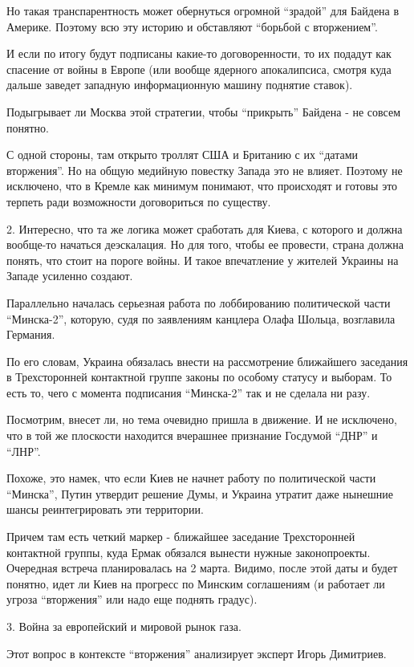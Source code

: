 Но такая транспарентность может обернуться огромной \enquote{зрадой} для Байдена в
Америке. Поэтому всю эту историю и обставляют \enquote{борьбой с вторжением}.

И если по итогу будут подписаны какие-то договоренности, то их подадут как
спасение от войны в Европе (или вообще ядерного апокалипсиса, смотря куда
дальше заведет западную информационную машину поднятие ставок). 

Подыгрывает ли Москва этой стратегии, чтобы \enquote{прикрыть} Байдена - не совсем
понятно.

С одной стороны, там открыто троллят США и Британию с их \enquote{датами вторжения}. Но
на общую медийную повестку Запада это не влияет. Поэтому не исключено, что в
Кремле как минимум понимают, что происходят и готовы это терпеть ради
возможности договориться по существу. 

2. Интересно, что та же логика может сработать для Киева, с которого и должна
вообще-то начаться деэскалация. Но для того, чтобы ее провести, страна должна
понять, что стоит на пороге войны. И такое впечатление у жителей Украины на
Западе усиленно создают. 

Параллельно началась серьезная работа по лоббированию политической части
\enquote{Минска-2}, которую, судя по заявлениям канцлера Олафа Шольца, возглавила
Германия.

По его словам, Украина обязалась внести на рассмотрение ближайшего заседания в
Трехсторонней контактной группе законы по особому статусу и выборам. То есть
то, чего с момента подписания \enquote{Минска-2} так и не сделала ни разу. 

Посмотрим, внесет ли, но тема очевидно пришла в движение. И не исключено, что в
той же плоскости находится вчерашнее признание Госдумой \enquote{ДНР} и \enquote{ЛНР}.

Похоже, это намек, что если Киев не начнет работу по политической части
\enquote{Минска}, Путин утвердит решение Думы, и Украина утратит даже нынешние шансы
реинтегрировать эти территории. 

Причем там есть четкий маркер - ближайшее заседание Трехсторонней контактной
группы, куда Ермак обязался вынести нужные законопроекты. Очередная встреча
планировалась на 2 марта. Видимо, после этой даты и будет понятно, идет ли Киев
на прогресс по Минским соглашениям (и работает ли угроза \enquote{вторжения} или надо
еще поднять градус). 

3. Война за европейский и мировой рынок газа.

Этот вопрос в контексте \enquote{вторжения} анализирует эксперт Игорь Димитриев. 

